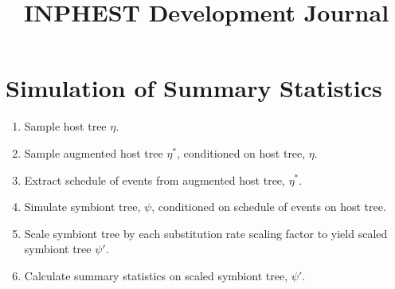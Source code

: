\documentclass[11pt]{article}
\newcommand{\hostTree}{\eta}
\newcommand{\augmentedHostTree}{\hostTree^{*}}
\newcommand{\symbiontTree}{\psi}
\newcommand{\scaledSymbiontTree}{\psi\prime}
\begin{document}
\title{INPHEST Development Journal}

\section{Simulation of Summary Statistics}
\label{summary-statistics-simulation-workflow} %

\begin{enumerate}
    \item Sample host tree $\hostTree$.
    \item Sample augmented host tree $\augmentedHostTree$, conditioned on host tree, $\hostTree$.
    \item Extract schedule of events from augmented host tree, $\augmentedHostTree$.
    \item Simulate symbiont tree, $\symbiontTree$, conditioned on schedule of events on host tree.
    \item Scale symbiont tree by each substitution rate scaling factor to yield scaled symbiont tree $\scaledSymbiontTree$.
    \item Calculate summary statistics on scaled symbiont tree, $\scaledSymbiontTree$.
\end{enumerate}
\end{document}

